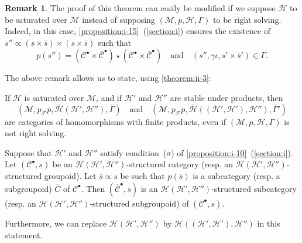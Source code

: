 \documentclass[a4paper,fleqn]{article}
\theoremstyle{plain}
\newenvironment{theorem}[1]
  {\renewcommand\theinnertheorem{#1}\innertheorem}
  {\endinnertheorem}
\theoremstyle{definition}
\newtheorem*{remark}{Remark}
\newcommand{\oldpage}[1]{{\marginpar{\footnotesize$\bigg\vert$\,\,\,\,\textit{p.~#1}}}}
\newcommand{\textand}{\quad\text{and}\quad}
\newcommand{\CC}{\mathcal{C}}
\newcommand{\HH}{\mathcal{H}}
\newcommand{\MM}{\mathcal{M}}
\newcommand{\FF}{\mathcal{F}}
\newcommand{\subs}{\mathrel{\propto}}
\newcommand{\smallbullet}{\bullet}
\begin{document}
\begin{remark}
  The proof of this theorem can easily be modified if we suppose $\HH$ to be saturated over $\MM$ instead of supposing $(\MM,p,\HH,\Gamma)$ to be right solving.
  Indeed, in this case, \cref{proposition:i-15}~(\cref{section:i}) ensures the existence of $s''\subs(s\times\overline{s})\times(s\times\overline{s})$ such that
  \[
    p(s'')=(\CC^\smallbullet\times\overline{\CC}^\smallbullet)\star(\CC^\smallbullet\times\overline{\CC}^\smallbullet)
    \textand
    (s'',\gamma\iota,s'\times\overline{s}')\in\Gamma.
  \]
\end{remark}

The above remark allows us to state, using \cref{theorem:ii-3}:

\begin{theorem}{13~bis}
\label{theorem:ii-13bis}
  If $\HH$ is saturated over $\MM$, and if $\HH'$ and $\HH''$ are stable under products, then
  \[
    (\MM,p_\FF\overline{p},\overline{\HH}(\HH',\HH''),\overline{\Gamma})
    \textand
    (\MM,p_\FF\overline{p},\overline{\HH}((\HH',\HH'),\HH''),\overline{\Gamma}')
  \]
  are categories of homomorphisms with finite products, even if $(\MM,p,\HH,\Gamma)$ is not right solving.
\end{theorem}

\begin{theorem}{14}
\label{theorem:ii-14}
  Suppose that $\HH'$ and $\HH''$ satisfy condition~($\sigma$) of \cref{proposition:i-10}~(\cref{section:i}).
  Let $(\CC^\smallbullet,s)$ be an $\HH(\HH',\HH'')$-structured category (resp. an $\HH(\HH',\HH'')$-structured groupoid).
  Let $\overline{s}\subs s$ be such that $p(\overline{s})$ is a subcategory (resp. a subgroupoid) $\overline{C}$ of $\CC^\smallbullet$.
  \oldpage{416}
  Then $(\overline{\CC}^\smallbullet,\overline{s})$ is an $\HH(\HH',\HH'')$-structured subcategory (resp. an $\HH(\HH',\HH'')$-structured subgroupoid) of $(\CC^\smallbullet,s)$.

  Furthermore, we can replace $\HH(\HH',\HH'')$ by $\HH((\HH',\HH'),\HH'')$ in this statement.
\end{theorem}
\end{document}
